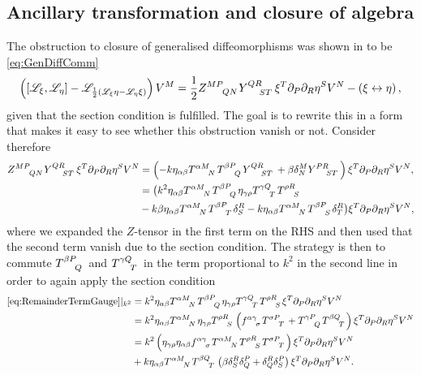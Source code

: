 \subsection{Ancillary transformation and closure of algebra}
The obstruction to closure of generalised diffeomorphisms was shown in to be  \eqref{eq:GenDiffComm} 
\begin{equation}\label{eq:GenDiffComm2}
    \left(\left[\mathscr{L}_\xi,\mathscr{L}_\eta\right]-\mathscr{L}_{\frac{1}{2}\left(\mathscr{L}_\xi\eta-\mathscr{L}_\eta\xi\right)}\right)V^M = \frac{1}{2}\tensor{Z}{^{MP}_{QN}}\tensor{Y}{^{QR}_{ST}}\xi^T\pd_P\pd_R\eta^SV^N-\left(\xi\leftrightarrow\eta\right),
\end{equation}
given that the section condition is fulfilled. The goal is to rewrite this in a form that makes it easy to see whether this obstruction vanish or not. Consider therefore
\begin{equation}\label{eq:RemainderTermGauge}
    \begin{aligned}
        \tensor{Z}{^{MP}_{QN}}\tensor{Y}{^{QR}_{ST}}\xi^T\pd_P\pd_R\eta^SV^N &= \left(-k\eta_{\alpha\beta}\tensor{T}{^{\alpha M}_N}\tensor{T}{^{\beta P}_Q}\tensor{Y}{^{QR}_{ST}}+\beta \delta^M_N\tensor{Y}{^{PR}_{ST}}\right)\xi^T\pd_P\pd_R\eta^SV^N,\\
        &= \big(k^2\eta_{\alpha\beta}\tensor{T}{^{\alpha M}_N}\tensor{T}{^{\beta P}_Q}\eta_{\gamma\rho}\tensor{T}{^{\gamma Q}_T}\tensor{T}{^{\rho R}_S}\\
        &-k\beta\eta_{\alpha\beta}\tensor{T}{^{\alpha M}_N}\tensor{T}{^{\beta P}_T}\delta^R_S-k\eta_{\alpha\beta}\tensor{T}{^{\alpha M}_N}\tensor{T}{^{\beta P}_S}\delta^{R}_T\big)\xi^T\pd_P\pd_R\eta^SV^N,
    \end{aligned}
\end{equation}
where we expanded the $Z$-tensor in the first term on the RHS and then used that the second term vanish due to the section condition. The strategy is then to commute $\tensor{T}{^{\beta P}_Q}$ and $\tensor{T}{^{\gamma Q}_T}$ in the term proportional to $k^2$ in the second line in order to again apply the section condition
\begin{equation}\label{eq:UseOfSec}
    \begin{aligned}
    \eqref{eq:RemainderTermGauge}|_{k^2} &= k^2\eta_{\alpha\beta}\tensor{T}{^{\alpha M}_N}\tensor{T}{^{\beta P}_Q}\eta_{\gamma\rho}\tensor{T}{^{\gamma Q}_T}\tensor{T}{^{\rho R}_S}\xi^T\pd_P\pd_R\eta^SV^N\\ &= k^2\eta_{\alpha\beta}\tensor{T}{^{\alpha M}_N}\eta_{\gamma\rho}\tensor{T}{^{\rho R}_S}\left(\tensor{f}{^{\alpha\gamma}_\sigma}\tensor{T}{^{\sigma P}_T}+\tensor{T}{^{\gamma P}_Q}\tensor{T}{^{\beta Q}_T}\right)\xi^T\pd_P\pd_R\eta^SV^N\\
    &= k^2\left(\eta_{\gamma\rho}\eta_{\alpha\beta}\tensor{f}{^{\alpha\gamma}_\sigma}\tensor{T}{^{\alpha M}_N}\tensor{T}{^{\rho R}_S}\tensor{T}{^{\sigma P}_T}\right)\xi^T\pd_P\pd_R\eta^SV^N\\
    &+ k\eta_{\alpha\beta}\tensor{T}{^{\alpha M}_N}\tensor{T}{^{\beta Q}_T}\left(\beta\delta^R_S\delta^P_Q+\delta^R_Q\delta^P_S\right)\xi^T\pd_P\pd_R\eta^SV^N.
    \end{aligned}
\end{equation}
